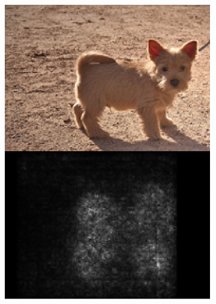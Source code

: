 \begin{figure}
\centering
 \begin{subfigure}{0.3\columnwidth}
    \includegraphics[width=0.95\columnwidth]{img/2-related-work/dog-saliency-map.png}
   \caption{}
    \label{fig:example-interpretability-1}
  \end{subfigure}
  \begin{subfigure}{0.3\columnwidth}

\end{subfigure}
\end{figure}
